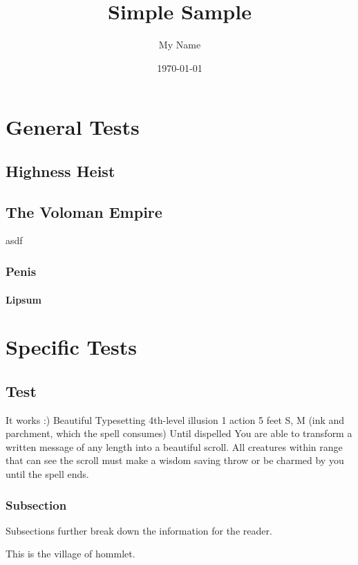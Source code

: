 \documentclass[letterpaper,twocolumn,openany,hidelinks]{memoir}
\title{Simple Sample} %
\author{My Name} %
\date{\today} %
\begin{document}
\begin{KeepFromToc}
	\tableofcontents
\end{KeepFromToc}

\part{General Tests}

\chapter{Highness Heist}

\lipsum


\chapter{The Voloman Empire}

asdf

\section{Penis}
\subsection{Lipsum}
\lipsum

\part{Specific Tests}

\chapter{Test}
It works :)
\RPGSpellHeader
	{Beautiful Typesetting}
	{4th-level illusion}
	{1 action}
	{5 feet}
	{S, M (ink and parchment, which the spell consumes)}
	{Until dispelled}
You are able to transform a written message of any length into a beautiful scroll. All creatures within range that can see the scroll must make a wisdom saving throw or be charmed by you until the spell ends.

\section{Subsection}
Subsections further break down the information for the reader.

 \label{hommlet-village}
This is the village of hommlet.
\end{document}
